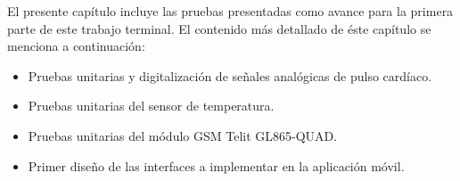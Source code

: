 El presente capítulo incluye las pruebas presentadas como avance para la primera parte de este trabajo terminal. El contenido más detallado de éste capítulo se menciona a continuación:

\begin{itemize}
	\item Pruebas unitarias y digitalización de señales analógicas de pulso cardíaco.
	\item Pruebas unitarias del sensor de temperatura.
	\item Pruebas unitarias del módulo GSM Telit GL865-QUAD.
	\item Primer diseño de las interfaces a implementar en la aplicación móvil.
\end{itemize}

